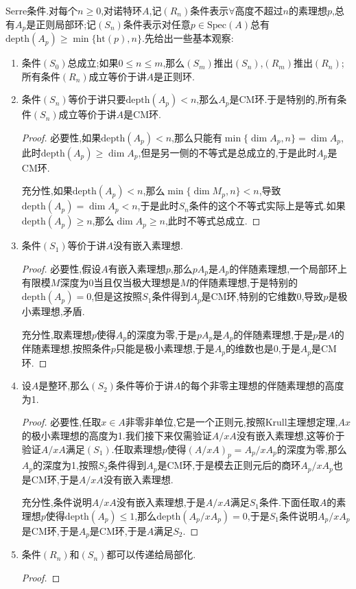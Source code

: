 Serre条件.对每个$n\ge0$,对诺特环$A$,记$(R_n)$条件表示$\forall$高度不超过$n$的素理想$p$,总有$A_p$是正则局部环;记$(S_n)$条件表示对任意$p\in\mathrm{Spec}(A)$总有$\mathrm{depth}(A_p)\ge\min\{\mathrm{ht}(p),n\}$.先给出一些基本观察:
\begin{enumerate}
	\item 条件$(S_0)$总成立;如果$0\le n\le m$,那么$(S_m)$推出$(S_n)$,$(R_m)$推出$(R_n)$;所有条件$(R_n)$成立等价于讲$A$是正则环.
	\item 条件$(S_n)$等价于讲只要$\mathrm{depth}(A_p)<n$,那么$A_p$是CM环.于是特别的,所有条件$(S_n)$成立等价于讲$A$是CM环.
	\begin{proof}
		
		必要性,如果$\mathrm{depth}(A_p)<n$,那么只能有$\min\{\dim A_p,n\}=\dim A_p$,此时$\mathrm{depth}(A_p)\ge\dim A_p$,但是另一侧的不等式是总成立的,于是此时$A_p$是CM环.
		
		充分性,如果$\mathrm{depth}(A_p)<n$,那么$\min\{\dim M_p,n\}<n$,导致$\mathrm{depth}(A_p)=\dim A_p<n$,于是此时$S_n$条件的这个不等式实际上是等式.如果$\mathrm{depth}(A_p)\ge n$,那么$\dim A_p\ge n$,此时不等式总成立.
	\end{proof}
	\item 条件$(S_1)$等价于讲$A$没有嵌入素理想.
	\begin{proof}
		
		必要性,假设$A$有嵌入素理想$p$,那么$pA_p$是$A_p$的伴随素理想,一个局部环上有限模$M$深度为0当且仅当极大理想是$M$的伴随素理想,于是特别的$\mathrm{depth}(A_p)=0$,但是这按照$S_1$条件得到$A_p$是CM环,特别的它维数0,导致$p$是极小素理想,矛盾.
		
		充分性,取素理想$p$使得$A_p$的深度为零,于是$pA_p$是$A_p$的伴随素理想,于是$p$是$A$的伴随素理想,按照条件$p$只能是极小素理想,于是$A_p$的维数也是0,于是$A_p$是CM环.
	\end{proof}
	\item 设$A$是整环,那么$(S_2)$条件等价于讲$A$的每个非零主理想的伴随素理想的高度为1.
	\begin{proof}
		
		必要性,任取$x\in A$非零非单位,它是一个正则元,按照Krull主理想定理,$Ax$的极小素理想的高度为1.我们接下来仅需验证$A/xA$没有嵌入素理想,这等价于验证$A/xA$满足$(S_1)$.任取素理想$p$使得$(A/xA)_p=A_p/xA_p$的深度为零,那么$A_p$的深度为1,按照$S_2$条件得到$A_p$是CM环,于是模去正则元后的商环$A_p/xA_p$也是CM环,于是$A/xA$没有嵌入素理想.
		
		充分性,条件说明$A/xA$没有嵌入素理想,于是$A/xA$满足$S_1$条件.下面任取$A$的素理想$p$使得$\mathrm{depth}(A_p)\le1$,那么$\mathrm{depth}(A_p/xA_p)=0$,于是$S_1$条件说明$A_p/xA_p$是CM环,于是$A_p$是CM环,于是$A$满足$S_2$.
	\end{proof}
	\item 条件$(R_n)$和$(S_n)$都可以传递给局部化.
	\begin{proof}
		

\end{proof}
\end{enumerate}
